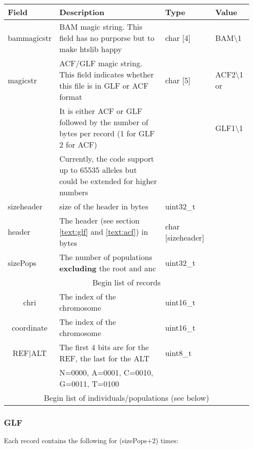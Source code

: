\documentclass[a4paper]{article}
\begin{document}
\begin{tabular}{|l|p{7cm}|l|l|}
\hline
{\bf Field} & {\bf Description} & {\bf Type} & {\bf Value} \\
\hline
bammagicstr & BAM magic string. This field has no purporse but to make htslib happy & char [4] & BAM\textbackslash1 \\
\hline
magicstr & ACF/GLF magic string. This field indicates whether this file is in GLF or ACF format & char [5] & ACF2\textbackslash1 or \\
         &  It is either ACF or GLF followed by the number of bytes per record (1 for GLF 2 for ACF)   &          & GLF1\textbackslash1 \\
         &  Currently, the code support up to 65535 alleles but could be extended for higher numbers   &          &  \\
\hline
sizeheader & size of the header in bytes   & uint32\_t         & \\
\hline
header     & The header (see section \ref{text:glf} and \ref{text:acf}) in bytes           & char [sizeheader] & \\
\hline
sizePops   & The number of populations {\bf excluding}  the root and anc & uint32\_t         & \\
\hline
\multicolumn{4}{|c|}{Begin list of records} \\
\hline
\multicolumn{1}{|c|}{chri}   & The index of the chromosome & uint16\_t         & \\
\hline
\multicolumn{1}{|c|}{coordinate}   & The index of the chromosome & uint16\_t         & \\
\hline
\multicolumn{1}{|c|}{REF$\vert$ALT}     & The first 4 bits are for the REF, the last for the ALT & uint8\_t         & \\
                                & N=0000, A=0001, C=0010, G=0011, T=0100                  &          & \\
\hline
\multicolumn{4}{|c|}{Begin list of individuals/populations (see below)} \\
\hline
\end{tabular}

\afterpage{\clearpage}


\subsubsection{GLF}

\noindent Each record contains the following for (sizePops+2) times:
\end{document}
